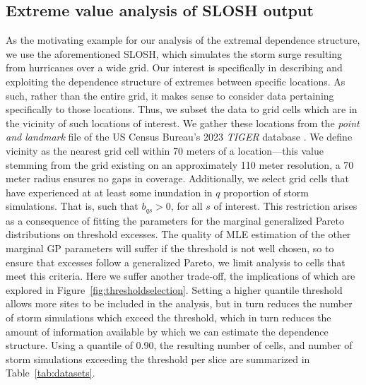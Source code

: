 \subsection{Extreme value analysis of SLOSH output\label{sec:slosh}}
As the motivating example for our analysis of the extremal dependence structure, we 
    use the aforementioned SLOSH, which simulates the storm surge resulting 
    from hurricanes over a wide grid.  Our interest is specifically in describing 
    and exploiting the dependence structure of extremes between specific locations.  
    As such, rather than the entire grid, it makes sense to consider data pertaining
    specifically to those locations. 
    Thus, we subset the data to grid cells which are in the vicinity of such locations 
    of interest.  We gather these locations from the \emph{point and landmark} file 
    of the US Census Bureau's 2023 \emph{TIGER} database \citep{tiger}.
    We define vicinity as the nearest grid cell within 70 meters of a location---this 
    value stemming from the grid existing on an approximately 110 meter resolution, a 
    70 meter radius ensures no gaps in coverage.
    Additionally, we select grid cells that have experienced at at least some inundation 
    in $q$ proportion of storm simulations.  That is, such that $b_{qs} > 0$, for all 
    $s$ of interest.  This restriction arises as a consequence of fitting the parameters 
    for the marginal generalized Pareto distributions on threshold excesses.
    The quality of MLE estimation of the other marginal GP parameters will suffer if the
    threshold is not well chosen, so to ensure that excesses follow a generalized Pareto,
    we limit analysis to cells that meet this criteria.
    Here we suffer another trade-off, the implications of which are explored in 
    Figure~\ref{fig:thresholdselection}.  Setting a higher quantile threshold allows more 
    sites to be included in the analysis, but in turn reduces the number of storm 
    simulations which exceed the threshold, which in turn reduces the amount of 
    information available by which we can estimate the dependence structure. Using a 
    quantile of \num{0.90}, the resulting number of cells, and number of storm simulations
    exceeding the threshold per slice are summarized in Table~\ref{tab:datasets}.

